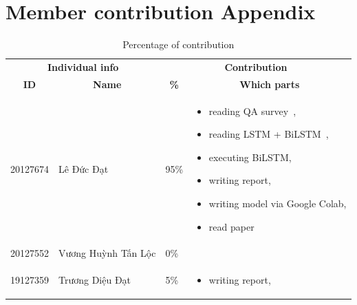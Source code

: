 \documentclass[11pt]{article}
\begin{document}
\section{Member contribution Appendix}
\label{sec:appendix}
\begin{table}[!th]
\centering
    \begin{tabular}{p{1.5cm}p{3cm}p{0.5cm}p{9cm}}
    \hline
    \multicolumn{2}{c}{\textbf{Individual info}} & \multicolumn{2}{c}{\textbf{ Contribution}}\\
    \multicolumn{1}{c}{\textbf{ID}} & \multicolumn{1}{c}{\textbf{Name}} & \multicolumn{1}{c}{\textbf{\%}} & \multicolumn{1}{c}{\textbf{Which parts}}\\\hline
    
    20127674 & Lê Đức Đạt & 95\% &
    \begin{itemize}[noitemsep,nolistsep]
        \item reading QA survey~\citep{2016arXiv160605250R}, 
        \item reading LSTM + BiLSTM~\citep{cite2website},
        \item executing BiLSTM,
        \item writing report,
        \item writing model via Google Colab,
        \item read paper \citep{smagulova2019survey}
    \end{itemize} \\ 
    
    
    20127552 & Vương Huỳnh Tấn Lộc & 0\% & \begin{itemize}
    \end{itemize} \\

    19127359 & Trương Diệu Đạt & 5\% &
    \begin{itemize}[noitemsep,nolistsep]
        \item writing report,
    \end{itemize} \\
    
    \hline\end{tabular}
\caption{Percentage of contribution}
\end{table}
\end{document}
